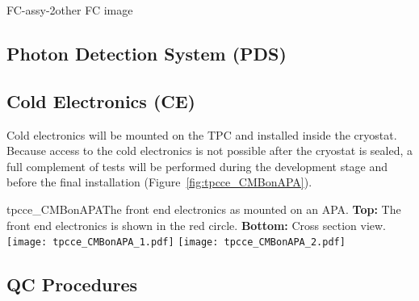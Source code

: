\begin{cdrfigure}{FC-assy-2}{other FC image}
\end{cdrfigure}


\subsection{Photon Detection System (PDS)}



\subsection{Cold Electronics (CE)}
\label{subsec:ce_install}

Cold electronics will be mounted on the TPC and installed inside the cryostat.
Because access to the cold electronics is not possible after the cryostat is sealed,
a full complement of tests will be performed during the development stage and before the final installation
(Figure~\ref{fig:tpcce_CMBonAPA}).

\begin{cdrfigure}{tpcce_CMBonAPA}{The front end electronics as mounted on an APA.
  {\bf Top:} The front end electronics  is shown in the red circle.
  {\bf Bottom:} Cross section view.}
\texttt{[image: tpcce\_CMBonAPA\_1.pdf]}
\texttt{[image: tpcce\_CMBonAPA\_2.pdf]}
\end{cdrfigure}


\subsection{QC Procedures}

